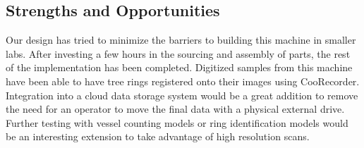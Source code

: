 \documentclass[a4paper,12pt]{article}
\begin{document}
\subsection{Strengths and Opportunities}
Our design has tried to minimize the barriers to building this machine in smaller labs. After investing a few hours in the sourcing and assembly of parts, 
the rest of the implementation has been completed. Digitized samples from this machine have been able to have tree rings registered onto their images using CooRecorder.
Integration into a cloud data storage system would be a great addition to remove the need for an operator to move the final data with a physical external drive. 
Further testing with vessel counting models or ring identification models would be an interesting extension to take advantage of high resolution scans.



\end{document}
